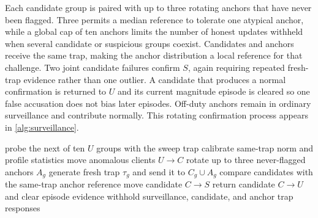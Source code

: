 \documentclass[conference]{IEEEtran}
\begin{document}
Each candidate group is paired with up to three rotating anchors that have never been flagged. Three permits a median reference to tolerate one atypical anchor, while a global cap of ten anchors limits the number of honest updates withheld when several candidate or suspicious groups coexist. Candidates and anchors receive the same trap, making the anchor distribution a local reference for that challenge. Two joint candidate failures confirm $S$, again requiring repeated fresh-trap evidence rather than one outlier. A candidate that produces a normal confirmation is returned to $U$ and its current magnitude episode is cleared so one false accusation does not bias later episodes. Off-duty anchors remain in ordinary surveillance and contribute normally. This rotating confirmation process appears in \autoref{alg:surveillance}.

\begin{algorithm}[t]
\caption{Phase III: surveillance and confirmation}
\label{alg:surveillance}
\begin{algorithmic}[1]
\State probe the next of ten $U$ groups with the sweep trap
 \State calibrate same-trap norm and profile statistics
 \State move anomalous clients $U\rightarrow C$
\EndIf
{}
 \State rotate up to three never-flagged anchors $A_g$
 \State generate fresh trap $\tau_g$ and send it to $C_g\cup A_g$
 \State compare candidates with the same-trap anchor reference
   \State move candidate $C\rightarrow S$
   \State return candidate $C\rightarrow U$ and clear episode evidence
 \EndIf
\EndFor
\State withhold surveillance, candidate, and anchor trap responses
\end{algorithmic}
\end{algorithm}
\end{document}
